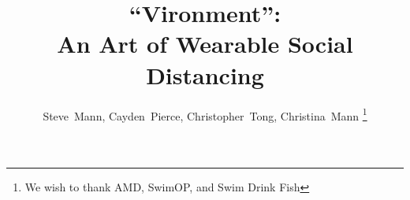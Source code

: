 \documentclass[journal]{journal}
\begin{document}
%
\title{``Vironment'':
\\
An Art of Wearable Social Distancing}
%
%
%

\author{Steve~Mann,
Cayden~Pierce,
Christopher~Tong,
Christina~Mann%
\thanks{We wish to thank AMD, SwimOP, and Swim Drink Fish}%
}

% 
%



% 
\end{document}
